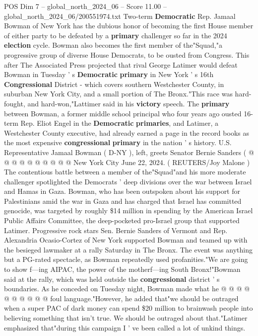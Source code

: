 \begin{textsample}{POS Dim 7 – global\_north\_2024\_06 – Score 11.00 – global\_north\_2024\_06/200551974.txt}  \label{ex:f7_pos_087}
Two-term \textbf{Democratic} Rep.
Jamaal Bowman of New York has the dubious honor of becoming the first House member of either party to be defeated by a \textbf{primary} challenger so far in the 2024 \textbf{election} cycle.
Bowman also becomes the first member of the"Squad,"a progressive group of diverse House Democrats, to be ousted from Congress.
This after The Associated Press projected that rival George Latimer would defeat Bowman in Tuesday ' s \textbf{Democratic} \textbf{primary} in New York ' s 16th \textbf{Congressional} District - which covers southern Westchester County, in suburban New York City, and a small portion of The Bronx."This race was hard-fought, and hard-won,"Lattimer said in his \textbf{victory} speech.
The \textbf{primary} between Bowman, a former middle school principal who four years ago ousted 16-term Rep.
Eliot Engel in the \textbf{Democratic} \textbf{primaries}, and Latimer, a Westchester County executive, had already earned a page in the record books as the most expensive \textbf{congressional} \textbf{primary} in the nation ' s history.
U.S.
Representative Jamaal Bowman ( D-NY ), left, greets Senator Bernie Sanders ( @ @ @ @ @ @ @ @ @ @ New York City June 22, 2024. ( REUTERS/Joy Malone ) The contentious battle between a member of the"Squad"and his more moderate challenger spotlighted the Democrats ' deep divisions over the war between Israel and Hamas in Gaza.
Bowman, who has been outspoken about his support for Palestinians amid the war in Gaza and has charged that Israel has committed genocide, was targeted by roughly \$14 million in spending by the American Israel Public Affairs Committee, the deep-pocketed pro-Israel group that supported Latimer.
Progressive rock stars Sen.
Bernie Sanders of Vermont and Rep.
Alexandria Ocasio-Cortez of New York supported Bowman and teamed up with the besieged lawmaker at a rally Saturday in The Bronx.
The event was anything but a PG-rated spectacle, as Bowman repeatedly used profanities."We are going to show f---ing AIPAC, the power of the motherf---ing South Bronx!"Bowman said at the rally, which was held outside the \textbf{congressional} district ' s boundaries.
As he conceded on Tuesday night, Bowman made what he @ @ @ @ @ @ @ @ @ @ foul language."However, he added that"we should be outraged when a super PAC of dark money can spend \$20 million to brainwash people into believing something that isn't true.
We should be outraged about that."Latimer emphasized that"during this campaign I ' ve been called a lot of unkind things.

\end{textsample}
